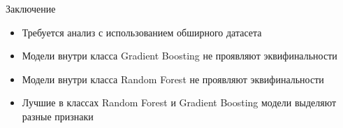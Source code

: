 \documentclass[xcolor=table]{beamer}
\begin{document}
\begin{frame}{Заключение}
    \begin{itemize}
        \item Требуется анализ с использованием обширного датасета
        \item Модели внутри класса Gradient Boosting не проявляют эквифинальности
        \item Модели внутри класса Random Forest не проявляют эквифинальности
        \item Лучшие в классах Random Forest и Gradient Boosting модели выделяют разные признаки
    \end{itemize}
\end{frame}
\end{document}
